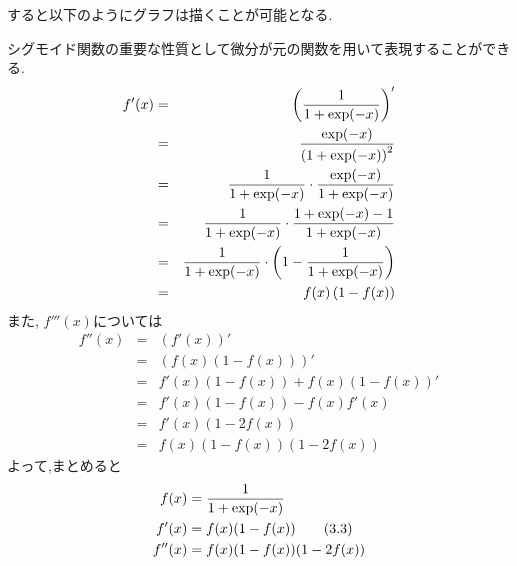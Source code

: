 すると以下のようにグラフは描くことが可能となる.
\begin{center}
\end{center}
シグモイド関数の重要な性質として微分が元の関数を用いて表現することができる.
\begin{eqnarray*}
    f'(x)&=&\left(\frac{1}{1+{\rm exp}(-x)}\right)'\\
        &=&\frac{{\rm exp}(-x)}{\left(1+{\rm exp}(-x)\right)^{2}}\\
        &=&\frac{1}{1+{\rm exp}(-x)}\cdot \frac{{\rm exp}(-x)}{1+{\rm exp}(-x)}\\
        &=&\frac{1}{1+{\rm exp}(-x)}\cdot \frac{1+{\rm exp}(-x)-1}{1+{\rm exp}(-x)}\\
        &=&\frac{1}{1+{\rm exp}(-x)}\cdot \left(1-\frac{1}{1+{\rm exp}(-x)}\right)\\
        &=&f(x)\left(1-f(x)\right)
\end{eqnarray*}
また, $f'''(x)$については
\begin{eqnarray*}
    f''(x) &=& \left(f'(x)\right)'\\
        &=& \left(f(x)(1-f(x))\right)'\\
        &=& f'(x)(1-f(x))+f(x)(1-f(x))'\\
        &=& f'(x)(1-f(x))-f(x)f'(x)\\
        &=& f'(x)(1-2f(x))\\
        &=& f(x)(1-f(x))(1-2f(x))
\end{eqnarray*}
よって,まとめると
\begin{align*}
    f(x) &= \frac{1}{1+{\rm exp}(-x)}\\
    f'(x)&=f(x)(1-f(x)) \tag {3.3} \\
    f''(x)&=f(x)(1-f(x))(1-2f(x))
\end{align*}
